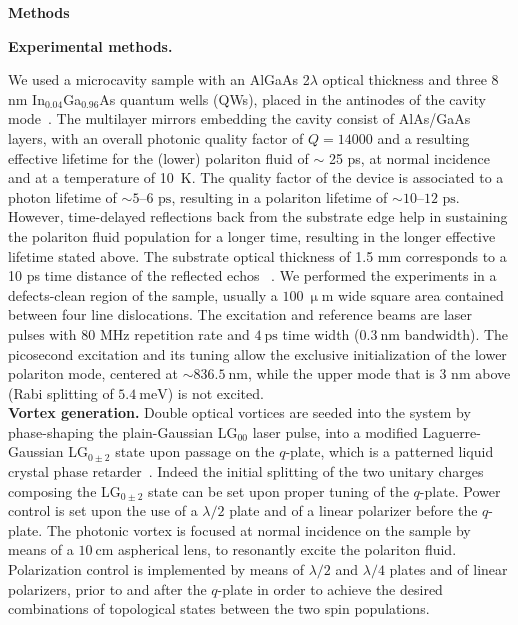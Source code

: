 \documentclass[aps,prb,twocolumn,superscriptaddress,nofootinbib]{revtex4}
\def\editr#1{#1}
\def\refer#1{#1}
\def\edstrike#1{}
\begin{document}
\bigskip



\noindent \textbf{Methods}\\
\small{
\noindent \textbf{Experimental methods.}
\edstrike{The polariton device and the main setup of the experiments are similar
to the ones used in Refs.~\cite{Dominici2014,dominici_real-space_2015,dominici_vortex_2015,gianfrate_superluminal_2018}.
More specifically, w} 
\editr{W}e used a microcavity sample
with an AlGaAs 2$\lambda$ optical thickness and three 8 nm
In$_{0.04}$Ga$_{0.96}$As quantum wells (QWs), placed in the antinodes of the
cavity mode~\cite{Dominici2014,dominici_real-space_2015,dominici_vortex_2015,gianfrate_superluminal_2018}. 
The multilayer mirrors embedding the
cavity consist of AlAs/GaAs layers, with an overall photonic
quality factor of $Q=14000$ and a resulting effective lifetime for the (lower)
polariton fluid of $\sim$ 25 ps, at normal incidence \edstrike{($k=0$)}
and at a temperature of 10~K.
The quality factor of the device is associated to a photon lifetime of $\sim 5\text{--}6\text{ ps}$,
resulting in a polariton lifetime of $\sim 10\text{--}12\text{ ps}$.
However, time-delayed reflections back from the substrate edge
help in sustaining the polariton fluid population for a longer time,
resulting in the longer effective lifetime stated above.
The substrate optical thickness of 1.5 mm
corresponds to a 10 ps time distance of the reflected echos~\cite{dominici_real-space_2015}
\edstrike{(see also Ref.~\onlinecite{dominici_real-space_2015})}.
%
We performed the experiments in a defects-clean region of the sample,
usually a $100~\upmu\text{m}$ wide square area contained between four line dislocations.
The excitation and reference beams are laser pulses with 80 MHz repetition
rate and $4~\text{ps}$ time width ($0.3~\text{nm}$ bandwidth).
The picosecond excitation and its tuning allow 
the exclusive initialization of the lower polariton mode,
centered at $\sim836.5~\text{nm}$,
while the upper mode that is 3 nm above
(Rabi splitting of $5.4~\text{meV}$)
 is not excited.\\

\noindent \editr{\textbf{Vortex generation.}}
Double optical vortices are \edstrike{imprinted} \refer{seeded} into the system by
phase-shaping the plain-Gaussian LG$_{00}$ laser pulse,
into a modified Laguerre-Gaussian LG$_{0\pm2}$ state
upon passage on the $q$-plate, which is a patterned liquid crystal phase
retarder~\cite{dominici_vortex_2015,Cardano2013,Marrucci2006}.
Indeed the initial splitting of the two unitary charges composing the LG$_{0\pm2}$ state
can be set upon proper tuning of the $q$-plate.
%
Power control is set upon the use of a $\lambda/2$ plate and of a linear polarizer before the $q$-plate.
The photonic vortex is focused at normal incidence on the sample by means of a $10~\text{cm}$ aspherical lens,
to resonantly excite the polariton fluid.
Polarization control is implemented by means of $\lambda/2$ and $\lambda/4$ plates and of linear polarizers,
prior to and after the $q$-plate in order to achieve the desired combinations
of topological states between the two spin populations.\\


}
\end{document}
